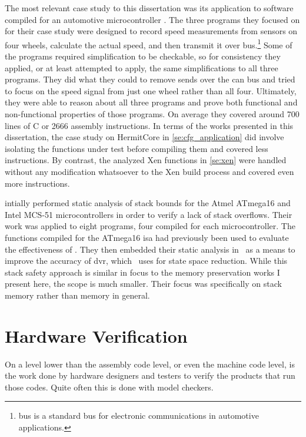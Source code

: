 The most relevant case study to this dissertation was its application
to software compiled for an automotive microcontroller \autocite{schlich2007automotive}.
The three programs they focused on for their case study
were designed to record speed measurements from sensors on four wheels,
calculate the actual speed, and then transmit it over  bus.\footnote{%
   bus is a standard bus for electronic communications
  in automotive applications.%
}
Some of the programs required simplification to be checkable,
so for consistency they applied, or at least attempted to apply,
the same simplifications to all three programs.
They did what they could to remove sends over the \ac{can} bus
and tried to focus on the speed signal from just one wheel rather than all four.
Ultimately, they were able to reason about all three programs
and prove both functional and non-functional properties of those programs.
On average they covered around 700 lines of C or \num{2666} assembly instructions.
In terms of the works presented in this dissertation,
the case study on HermitCore in \cref{se:cfg_application}
did involve isolating the functions under test before compiling them
and covered less instructions.
By contrast, the analyzed Xen functions in \cref{se:xen} were handled
without any modification whatsoever to the Xen build process
and covered even more instructions.

\Textcite{brauer2009sba} intially performed static analysis of stack bounds
for the Atmel ATmega16 and Intel MCS-51 microcontrollers
in order to verify a lack of stack overflows.
Their work was applied to eight programs, four compiled for each microcontroller.
The functions compiled for the ATmega16 \ac{isa}
had previously been used to evaluate the effectiveness of \mcsquare.
They then embedded their static analysis in \mcsquare\ as a means to
improve the accuracy of \ac{dvr}, which \mcsquare\ uses for state space reduction.
While this stack safety approach is similar in focus to the memory preservation works
I present here, the scope is much smaller.
Their focus was specifically on stack memory rather than memory in general.

\section{Hardware Verification}\label{se:hardware}
On a level lower than the assembly code level, or even the machine code level,
is the work done by hardware designers and testers
to verify the products that run those codes.
Quite often this is done with model checkers.

